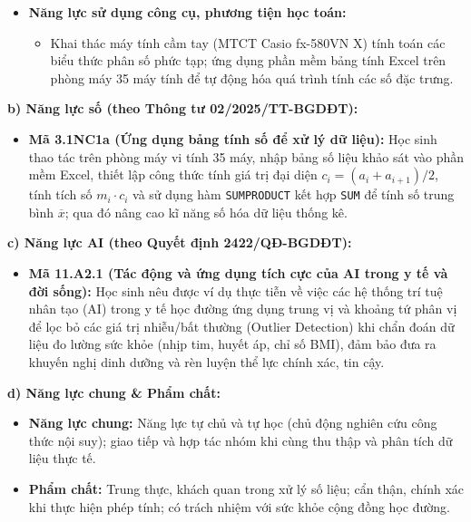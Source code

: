 \documentclass[12pt, a4paper]{article}
\begin{document}
\begin{itemize}[leftmargin=1.5em]
\begin{itemize}
    \end{itemize}
    \item \textbf{Năng lực sử dụng công cụ, phương tiện học toán:}
    \begin{itemize}
        \item Khai thác máy tính cầm tay (MTCT Casio fx-580VN X) tính toán các biểu thức phân số phức tạp; ứng dụng phần mềm bảng tính Excel trên phòng máy 35 máy tính để tự động hóa quá trình tính các số đặc trưng.
    \end{itemize}
\end{itemize}

\textbf{b) Năng lực số (theo Thông tư 02/2025/TT-BGDĐT):}
\begin{itemize}[leftmargin=1.5em]
    \item \textbf{Mã 3.1NC1a (Ứng dụng bảng tính số để xử lý dữ liệu):} Học sinh thao tác trên phòng máy vi tính 35 máy, nhập bảng số liệu khảo sát vào phần mềm Excel, thiết lập công thức tính giá trị đại diện $c_i = (a_i + a_{i+1})/2$, tính tích số $m_i \cdot c_i$ và sử dụng hàm \texttt{SUMPRODUCT} kết hợp \texttt{SUM} để tính số trung bình $\overline{x}$; qua đó nâng cao kĩ năng số hóa dữ liệu thống kê.
\end{itemize}

\textbf{c) Năng lực AI (theo Quyết định 2422/QĐ-BGDĐT):}
\begin{itemize}[leftmargin=1.5em]
    \item \textbf{Mã 11.A2.1 (Tác động và ứng dụng tích cực của AI trong y tế và đời sống):} Học sinh nêu được ví dụ thực tiễn về việc các hệ thống trí tuệ nhân tạo (AI) trong y tế học đường ứng dụng trung vị và khoảng tứ phân vị để lọc bỏ các giá trị nhiễu/bất thường (Outlier Detection) khi chẩn đoán dữ liệu đo lường sức khỏe (nhịp tim, huyết áp, chỉ số BMI), đảm bảo đưa ra khuyến nghị dinh dưỡng và rèn luyện thể lực chính xác, tin cậy.
\end{itemize}

\textbf{d) Năng lực chung \& Phẩm chất:}
\begin{itemize}[leftmargin=1.5em]
    \item \textbf{Năng lực chung:} Năng lực tự chủ và tự học (chủ động nghiên cứu công thức nội suy); giao tiếp và hợp tác nhóm khi cùng thu thập và phân tích dữ liệu thực tế.
    \item \textbf{Phẩm chất:} Trung thực, khách quan trong xử lý số liệu; cẩn thận, chính xác khi thực hiện phép tính; có trách nhiệm với sức khỏe cộng đồng học đường.
\end{itemize}
\end{document}
